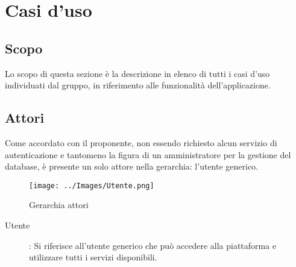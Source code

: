 \section{Casi d'uso}
\subsection{Scopo}
Lo scopo di questa sezione è la descrizione in elenco di tutti i casi d'uso individuati dal gruppo, in riferimento alle funzionalità dell'applicazione.
\subsection{Attori}
Come accordato con il proponente, non essendo richiesto alcun servizio di autenticazione e tantomeno la figura di un amministratore per la gestione del database, è presente un solo attore nella gerarchia: l'utente generico.

\begin{figure}[h]
\texttt{[image: ../Images/Utente.png]}
\centering
\caption{Gerarchia attori}
\end{figure}

\begin{description}
\item[Utente]:
Si riferisce all'utente generico che può accedere alla piattaforma e utilizzare tutti i servizi disponibili.
\end{description}

\newpage





\newpage












\newpage








\newpage




\newpage




